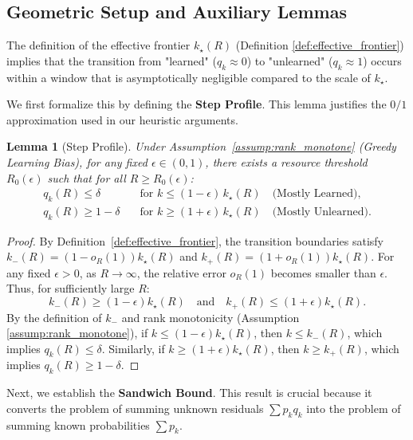 \documentclass{article}
\theoremstyle{plain}
\newtheorem{lemma}[theorem]{Lemma}
\theoremstyle{definition}
\theoremstyle{remark}
\begin{document}
\subsection{Geometric Setup and Auxiliary Lemmas}

The definition of the effective frontier $k_\star(R)$ (Definition \ref{def:effective_frontier}) implies that the transition from "learned" ($q_k \approx 0$) to "unlearned" ($q_k \approx 1$) occurs within a window that is asymptotically negligible compared to the scale of $k_\star$.

We first formalize this by defining the \textbf{Step Profile}. This lemma justifies the $0/1$ approximation used in our heuristic arguments.

\begin{lemma}[Step Profile]
\label{lem:step_surrogate}
Under Assumption~\ref{assump:rank_monotone} (Greedy Learning Bias), for any fixed $\epsilon\in(0,1)$, there exists a resource threshold $R_0(\epsilon)$ such that for all $R\ge R_0(\epsilon)$:
\begin{equation*}
\begin{aligned}
q_k(R) \le \delta \quad &\text{for } k \le (1-\epsilon)\,k_\star(R) \quad \text{(Mostly Learned)},\\
q_k(R) \ge 1-\delta \quad &\text{for } k \ge (1+\epsilon)\,k_\star(R) \quad \text{(Mostly Unlearned)}.
\end{aligned}
\end{equation*}
\end{lemma}


\begin{proof}
By Definition~\ref{def:effective_frontier}, the transition boundaries satisfy $k_{-}(R) = (1-o_R(1))k_\star(R)$ and $k_{+}(R) = (1+o_R(1))k_\star(R)$.
For any fixed $\epsilon > 0$, as $R \to \infty$, the relative error $o_R(1)$ becomes smaller than $\epsilon$. Thus, for sufficiently large $R$:
\[
k_{-}(R) \ge (1-\epsilon)k_\star(R) \quad \text{and} \quad k_{+}(R) \le (1+\epsilon)k_\star(R).
\]
By the definition of $k_-$ and rank monotonicity (Assumption \ref{assump:rank_monotone}), if $k \le (1-\epsilon)k_\star(R)$, then $k \le k_-(R)$, which implies $q_k(R) \le \delta$.
Similarly, if $k \ge (1+\epsilon)k_\star(R)$, then $k \ge k_+(R)$, which implies $q_k(R) \ge 1-\delta$.
\end{proof}

Next, we establish the \textbf{Sandwich Bound}. This result is crucial because it converts the problem of summing unknown residuals $\sum p_k q_k$ into the problem of summing known probabilities $\sum p_k$.
\end{document}
